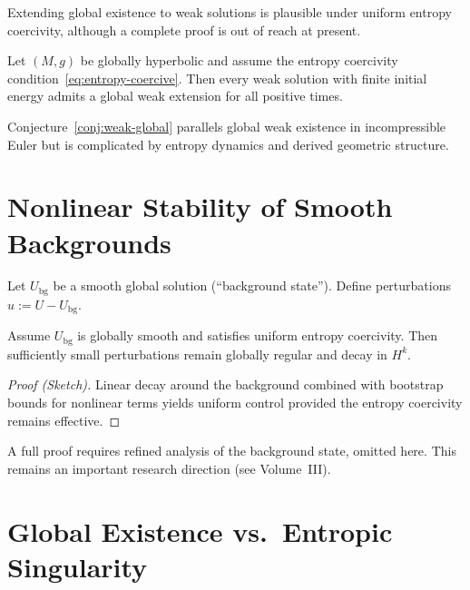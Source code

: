 Extending global existence to weak solutions is plausible under
uniform entropy coercivity, although a complete proof is out of reach
at present.

\begin{conjecture}
\label{conj:weak-global}
Let $(M,g)$ be globally hyperbolic and assume the entropy coercivity
condition~\eqref{eq:entropy-coercive}.
Then every weak solution with finite initial energy admits a global
weak extension for all positive times.
\end{conjecture}

\begin{remark}
Conjecture~\ref{conj:weak-global} parallels global weak existence in
incompressible Euler but is complicated by entropy dynamics and
derived geometric structure.
\end{remark}



\section{Nonlinear Stability of Smooth Backgrounds}
\label{sec:stability}

Let $U_{\mathrm{bg}}$ be a smooth global solution (``background state'').
Define perturbations $u:=U-U_{\mathrm{bg}}$.

\begin{theorem}
\label{thm:nonlinear-stability}
Assume $U_{\mathrm{bg}}$ is globally smooth and satisfies uniform
entropy coercivity.  Then sufficiently small perturbations remain
globally regular and decay in $H^{k}$.
\end{theorem}

\begin{proof}[Proof (Sketch)]
Linear decay around the background combined with bootstrap bounds for
nonlinear terms yields uniform control provided the entropy coercivity
remains effective.
\end{proof}

\begin{remark}
A full proof requires refined analysis of the background state, omitted
here.  This remains an important research direction (see Volume~III).
\end{remark}



\section{Global Existence vs.~Entropic Singularity}
\label{sec:dichotomy}

